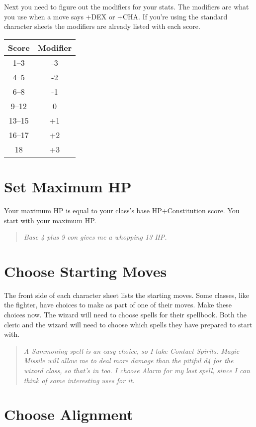  Next you need to figure out the modifiers for your stats. The modifiers are what you use when a move says +DEX or +CHA. If you're using the standard character sheets the modifiers are already listed with each score.
\begin{center}
\begin{tabular}{|c|c|}\hline
Score & Modifier \\ \hline
1--3 & -3\\ \hline
4--5 & -2\\ \hline
6--8 & -1\\ \hline
9--12 & 0\\ \hline
13--15 & +1\\ \hline
16--17 & +2\\ \hline
18 & +3\\ \hline
\end{tabular}
\end{center}
\section{Set Maximum HP}


 Your maximum HP is equal to your class's base HP+Constitution score. You start with your maximum HP.


\begin{quote}
\emph{ Base 4 plus 9 con gives me a whopping 13 HP. }
\end{quote}
\section{Choose Starting Moves} 


 The front side of each character sheet lists the starting moves. Some classes, like the fighter, have choices to make as part of one of their moves. Make these choices now. The wizard will need to choose spells for their spellbook. Both the cleric and the wizard will need to choose which spells they have prepared to start with.

\begin{quote}
\emph{ A Summoning spell is an easy choice, so I take Contact Spirits. Magic Missile will allow me to deal more damage than the pitiful d4 for the wizard class, so that's in too. I choose Alarm for my last spell, since I can think of some interesting uses for it.}
\end{quote}
\section{Choose Alignment}


